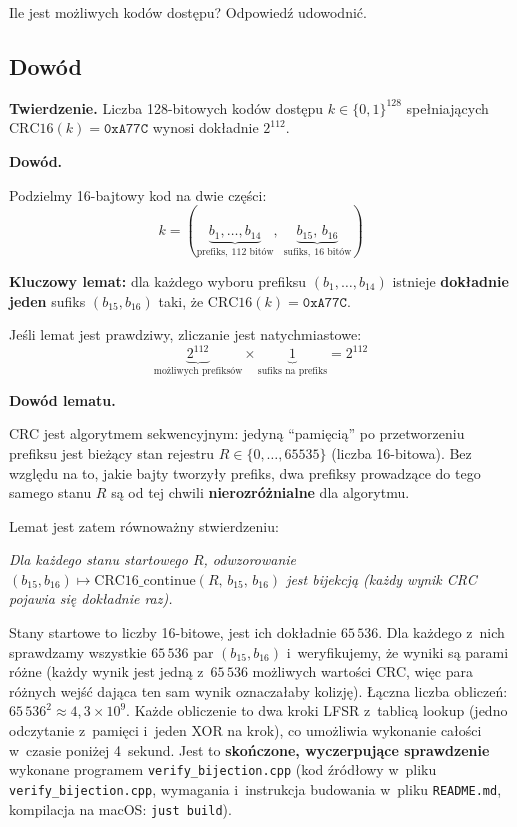 \documentclass[12pt,a4paper]{article}
\begin{document}
Ile jest możliwych kodów dostępu? Odpowiedź udowodnić.

\subsection*{Dowód}

\textbf{Twierdzenie.} Liczba 128-bitowych kodów dostępu $k \in \{0,1\}^{128}$
spełniających $\mathrm{CRC16}(k) = \texttt{0xA77C}$ wynosi dokładnie $2^{112}$.

\medskip
\noindent\textbf{Dowód.}

Podzielmy 16-bajtowy kod na dwie części:
\[
  k = (\underbrace{b_1,\ldots,b_{14}}_{\text{prefiks},\ 112\text{ bitów}},\;
       \underbrace{b_{15},\, b_{16}}_{\text{sufiks},\ 16\text{ bitów}})
\]

\noindent\textbf{Kluczowy lemat:} dla każdego wyboru prefiksu $(b_1,\ldots,b_{14})$
istnieje \textbf{dokładnie jeden} sufiks $(b_{15}, b_{16})$ taki, że
$\mathrm{CRC16}(k) = \texttt{0xA77C}$.

Jeśli lemat jest prawdziwy, zliczanie jest natychmiastowe:
\[
  \underbrace{2^{112}}_{\text{możliwych prefiksów}}
  \times
  \underbrace{1}_{\text{sufiks na prefiks}}
  = 2^{112}
\]

\noindent\textbf{Dowód lematu.}

CRC jest algorytmem sekwencyjnym: jedyną ``pamięcią'' po przetworzeniu prefiksu
jest bieżący stan rejestru $R \in \{0,\ldots,65535\}$ (liczba 16-bitowa).
Bez względu na to, jakie bajty tworzyły prefiks, dwa prefiksy prowadzące
do tego samego stanu $R$ są od tej chwili \textbf{nierozróżnialne} dla algorytmu.

Lemat jest zatem równoważny stwierdzeniu:
\begin{center}
\textit{Dla każdego stanu startowego $R$, odwzorowanie
$(b_{15}, b_{16}) \mapsto \mathrm{CRC16\_continue}(R,\, b_{15},\, b_{16})$
jest bijekcją (każdy wynik CRC pojawia się dokładnie raz).}
\end{center}

Stany startowe to liczby 16-bitowe, jest ich dokładnie $65\,536$.
Dla każdego z~nich sprawdzamy wszystkie $65\,536$ par $(b_{15}, b_{16})$
i~weryfikujemy, że wyniki są parami różne (każdy wynik jest jedną z~$65\,536$
możliwych wartości CRC, więc para różnych wejść dająca ten sam wynik oznaczałaby kolizję).
Łączna liczba obliczeń: $65\,536^2 \approx 4{,}3 \times 10^9$.
Każde obliczenie to dwa kroki LFSR z~tablicą lookup (jedno odczytanie z~pamięci
i~jeden XOR na krok), co umożliwia wykonanie całości w~czasie poniżej 4~sekund.
Jest to \textbf{skończone, wyczerpujące sprawdzenie} wykonane programem
\texttt{verify\_bijection.cpp} (kod źródłowy w~pliku \texttt{verify\_bijection.cpp},
wymagania i~instrukcja budowania w~pliku \texttt{README.md},
kompilacja na macOS: \texttt{just build}).
\end{document}
